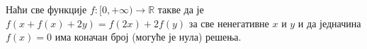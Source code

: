 \problem{}
Наћи све функције $f \colon [0, +\infty) \to \mathbb{R}$ такве да је
$f(x + f(x) + 2 y) = f(2 x) + 2 f(y)$ за све ненегативне $x$ и $y$ и да
једначина $f(x) = 0$ има коначан број (могуће је нула) решења.

\solution

\endproblem
